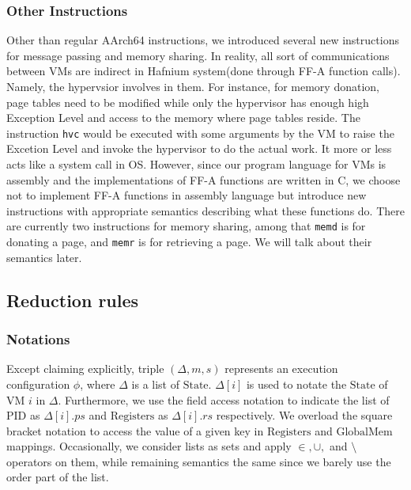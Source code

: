\documentclass[a4paper]{article}
\newcommand*{\STATE}{\text{State}}
\newcommand*{\MEM}{\text{GlobalMem}}
\newcommand*{\PID}{\text{PID}}
\newcommand*{\REGS}{\text{Registers}}
\begin{document}
\subsubsection{Other Instructions}
Other than regular AArch64 instructions, we introduced several new instructions
for message passing and memory sharing. In reality, all sort of communications
between VMs are indirect in Hafnium system(done through FF-A function calls).
Namely, the hypervsior involves in them. For instance, for memory donation, page
tables need to be modified while only the hypervisor has enough high Exception
Level and access to the memory where page tables reside. The instruction
\texttt{hvc} would be executed with some arguments by the VM to raise the
Excetion Level and invoke the hypervisor to do the actual work. It more or less
acts like a system call in OS. However, since our program language for VMs is
assembly and the implementations of FF-A functions are written in C, we choose
not to implement FF-A functions in assembly language but introduce new
instructions with appropriate semantics describing what these functions do.
There are currently two instructions for memory sharing, among that
\texttt{memd} is for donating a page, and \texttt{memr} is for retrieving a
page. We will talk about their semantics later.




\subsection{Reduction rules}
\subsubsection{Notations}
Except claiming explicitly, triple $(\Delta, m, s)$ represents an execution
configuration $\phi$, where $\Delta$ is a list of $\STATE$. $\Delta[i]$ is used
to notate the $\STATE$ of VM $i$ in $\Delta$. Furthermore, we use the field
access notation to indicate the list of $\PID$ as $\Delta[i].ps$ and $\REGS$ as
$\Delta[i].rs$ respectively. We overload the square bracket notation to access
the value of a given key in $\REGS$ and $\MEM$ mappings. Occasionally, we
consider lists as sets and apply $\in, \cup,$ and $\setminus$ operators on them,
while remaining semantics the same since we barely use the order part of the
list.

\end{document}
